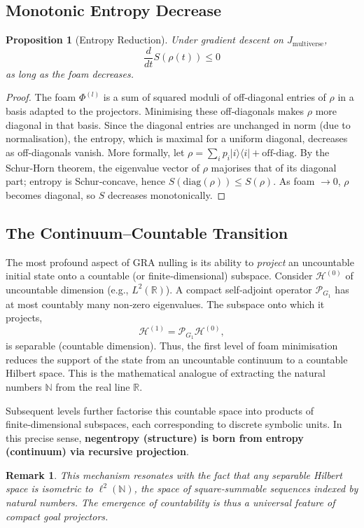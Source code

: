 \documentclass[11pt]{article}
\newtheorem{proposition}[theorem]{Proposition}
\newtheorem{remark}[theorem]{Remark}
\newcommand{\cP}{\mathcal{P}}
\newcommand{\cH}{\mathcal{H}}
\begin{document}
\subsection{Monotonic Entropy Decrease}
\begin{proposition}[Entropy Reduction]
Under gradient descent on $J_{\text{multiverse}}$,
\[
\frac{d}{dt} S(\rho(t)) \le 0
\]
as long as the foam decreases.
\end{proposition}
\begin{proof}
The foam $\Phi^{(l)}$ is a sum of squared moduli of off‑diagonal entries of $\rho$ in a basis adapted to the projectors. Minimising these off‑diagonals makes $\rho$ more diagonal in that basis. Since the diagonal entries are unchanged in norm (due to normalisation), the entropy, which is maximal for a uniform diagonal, decreases as off‑diagonals vanish. More formally, let $\rho = \sum_{i} p_i |i\rangle\langle i| + \text{off‑diag}$. By the Schur‑Horn theorem, the eigenvalue vector of $\rho$ majorises that of its diagonal part; entropy is Schur‑concave, hence $S(\text{diag}(\rho)) \le S(\rho)$. As foam $\to 0$, $\rho$ becomes diagonal, so $S$ decreases monotonically.
\end{proof}

\subsection{The Continuum–Countable Transition}
\label{sec:continuum}
The most profound aspect of GRA nulling is its ability to \emph{project} an uncountable initial state onto a countable (or finite‑dimensional) subspace. Consider $\cH^{(0)}$ of uncountable dimension (e.g., $L^2(\mathbb{R})$). A compact self‑adjoint operator $\cP_{G_1}$ has at most countably many non‑zero eigenvalues. The subspace onto which it projects,
\[
\cH^{(1)} = \cP_{G_1} \cH^{(0)},
\]
is separable (countable dimension). Thus, the first level of foam minimisation reduces the support of the state from an uncountable continuum to a countable Hilbert space. This is the mathematical analogue of extracting the natural numbers $\mathbb{N}$ from the real line $\mathbb{R}$.

Subsequent levels further factorise this countable space into products of finite‑dimensional subspaces, each corresponding to discrete symbolic units. In this precise sense, \textbf{negentropy (structure) is born from entropy (continuum) via recursive projection}.

\begin{remark}
This mechanism resonates with the fact that any separable Hilbert space is isometric to $\ell^2(\mathbb{N})$, the space of square‑summable sequences indexed by natural numbers. The emergence of countability is thus a universal feature of compact goal projectors.
\end{remark}
\end{document}
